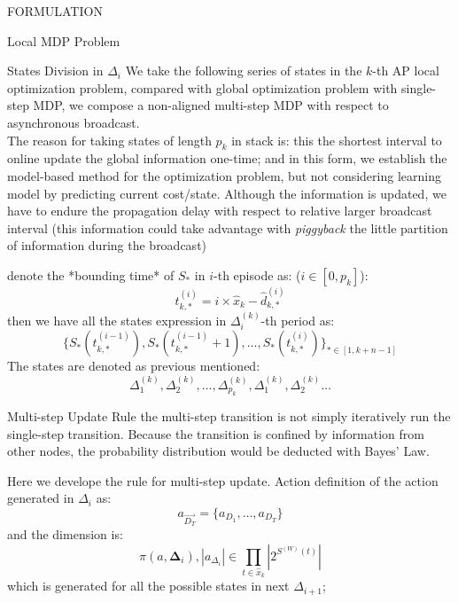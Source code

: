 \documentclass[10pt, conference, letterpaper]{IEEEtran}
\begin{document}
\begin{section}{FORMULATION}
\begin{subsection}{Local MDP Problem}
            \begin{subsubsection}{States Division in $\Delta_i$}
                We take the following series of states in the $k$-th AP local optimization problem, compared with global optimization problem with single-step MDP, we compose a non-aligned multi-step MDP with respect to asynchronous broadcast.
                \\
                The reason for taking states of length $p_k$ in stack is: this the shortest interval to online update the global information one-time; and in this form, we establish the model-based method for the optimization problem, but not considering learning model by predicting current cost/state. Although the information is updated, we have to endure the propagation delay with respect to relative larger broadcast interval (this information could take advantage with \emph{piggyback} the little partition of information during the broadcast)

                denote the *bounding time* of $S_*$ in $i$-th episode as: ($i \in [0, p_k]$):
                $$
                t^{(i)}_{k,*} = i \times \hat{x}_k - \hat{d}^{(i)}_{k,*}
                $$
                then we have all the states expression in $\Delta^{(k)}_i$-th period as:
                $$
                \{ S_*(t^{(i-1)}_{k,*}), S_*(t^{(i-1)}_{k,*}+1), \dots, S_*(t^{(i)}_{k,*}) \}_{* \in [1,k+n-1]}
                $$
                The states are denoted as previous mentioned:
                $$
                \Delta^{(k)}_{1}, \Delta^{(k)}_{2}, \dots, \Delta^{(k)}_{p_k}, \Delta^{(k)}_{1}, \Delta^{(k)}_{2}\dots
                $$
            \end{subsubsection}

            \begin{subsubsection}{Multi-step Update Rule}
                the multi-step transition is not simply iteratively run the single-step transition. Because the transition is confined by information from other nodes, the probability distribution would be deducted with Bayes' Law.

                Here we develope the rule for multi-step update.
                Action definition of the action generated in $\Delta_{i}$ as:
                $$
                a_{\vec{D_T}} = \{ a_{D_1}, \dots, a_{D_T} \}
                $$
                and the dimension is:
                $$
                \pi(a, \mathbf{\Delta}_i), |a_{\Delta_i}| \in \prod_{t \in \hat{x}_k} |2^{S^{(W)}(t)}|
                $$
                which is generated for all the possible states in next $\Delta_{i+1}$;


\end{subsubsection}
\end{subsection}
\end{section}
\end{document}
